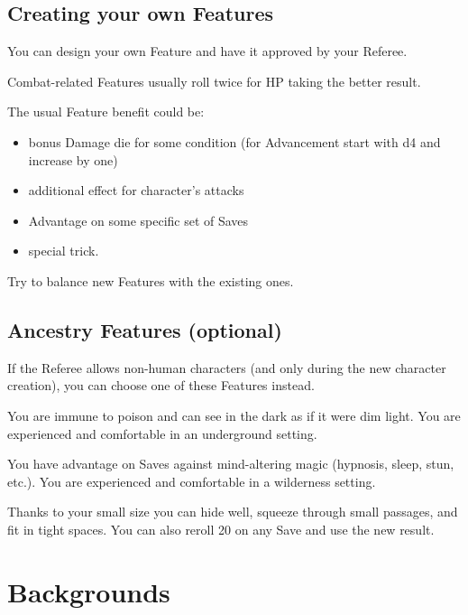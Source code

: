 \documentclass[itdr]{subfiles}
\begin{document}
\begin{dbox}
\subsection*{Creating your own Features}

You can design your own Feature and have it approved by your Referee.

Combat-related Features usually roll twice for HP taking the better result.

The usual Feature benefit could be:
\begin{itemize}
	\item bonus Damage die for some condition (for Advancement start with d4 and increase by one)
	\item additional effect for character's attacks
	\item Advantage on some specific set of Saves
	\item special trick.
\end{itemize}

Try to balance new Features with the existing ones.\hspace{-0.6em}
\end{dbox}

\vfill
\subsection*{Ancestry Features (optional)}

If the Referee allows non-human characters (and only during the new character creation), you can choose one of these Features instead.

\vfill
{}
You are immune to poison and can see in the dark as if it were dim light. You are experienced and comfortable in an underground setting.

\vfill
{}
You have advantage on Saves against mind-altering magic (hypnosis, sleep, stun, etc.). You are experienced and comfortable in a wilderness setting.

\vfill
{}
Thanks to your small size you can hide well, squeeze through small passages, and fit in tight spaces. You can also reroll 20 on any Save and use the new result.

\vfill
\break


\section{Backgrounds}
\end{document}
